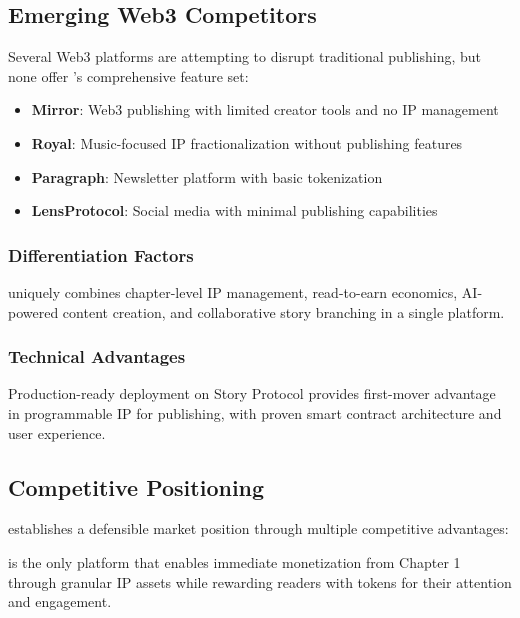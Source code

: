 \subsection{Emerging Web3 Competitors}

Several Web3 platforms are attempting to disrupt traditional publishing, but none offer \storyhouse{}'s comprehensive feature set:

\begin{itemize}
    \item \textbf{Mirror}: Web3 publishing with limited creator tools and no IP management
    \item \textbf{Royal}: Music-focused IP fractionalization without publishing features
    \item \textbf{Paragraph}: Newsletter platform with basic tokenization
    \item \textbf{LensProtocol}: Social media with minimal publishing capabilities
\end{itemize}

\subsubsection{Differentiation Factors}

\storyhouse{} uniquely combines chapter-level IP management, read-to-earn economics, AI-powered content creation, and collaborative story branching in a single platform.

\subsubsection{Technical Advantages}

Production-ready deployment on Story Protocol provides first-mover advantage in programmable IP for publishing, with proven smart contract architecture and user experience.

\subsection{Competitive Positioning}

\storyhouse{} establishes a defensible market position through multiple competitive advantages:

\begin{innovation}
\storyhouse{} is the only platform that enables immediate monetization from Chapter 1 through granular IP assets while rewarding readers with \tip{} tokens for their attention and engagement.
\end{innovation}

